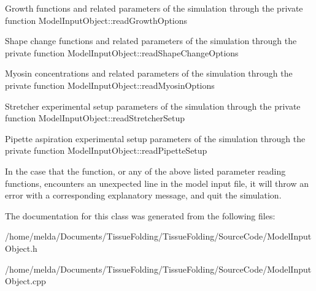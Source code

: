 Growth functions and related parameters of the simulation through the private function Model\+Input\+Object\+::read\+Growth\+Options

Shape change functions and related parameters of the simulation through the private function Model\+Input\+Object\+::read\+Shape\+Change\+Options

Myosin concentrations and related parameters of the simulation through the private function Model\+Input\+Object\+::read\+Myosin\+Options

Stretcher experimental setup parameters of the simulation through the private function Model\+Input\+Object\+::read\+Stretcher\+Setup

Pipette aspiration experimental setup parameters of the simulation through the private function Model\+Input\+Object\+::read\+Pipette\+Setup

In the case that the function, or any of the above listed parameter reading functions, encounters an unexpected line in the model input file, it will throw an error with a corresponding explanatory message, and quit the simulation.

The documentation for this class was generated from the following files\+:\begin{DoxyCompactItemize}
\item 
/home/melda/\+Documents/\+Tissue\+Folding/\+Tissue\+Folding/\+Source\+Code/Model\+Input\+Object.\+h\item 
/home/melda/\+Documents/\+Tissue\+Folding/\+Tissue\+Folding/\+Source\+Code/Model\+Input\+Object.\+cpp\end{DoxyCompactItemize}

